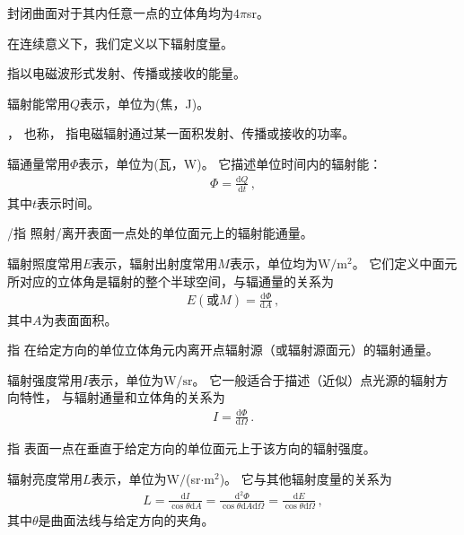 \begin{corollary}
      封闭曲面对于其内任意一点的立体角均为$4\pi$sr。
\end{corollary}

在连续意义下，我们定义以下辐射度量。

\begin{definition}
      指以电磁波形式发射、传播或接收的能量。
\end{definition}
辐射能常用$Q$表示，单位为(焦，J)。

\begin{definition}
      ，
      也称，
      指电磁辐射通过某一面积发射、传播或接收的功率。
\end{definition}
辐通量常用$\varPhi$表示，单位为(瓦，W)。
它描述单位时间内的辐射能：
\begin{align}
      \varPhi=\frac{\mathrm{d}Q}{\mathrm{d}t}\, ,
\end{align}
其中$t$表示时间。

\begin{definition}
      /指
      照射/离开表面一点处的单位面元上的辐射能通量。
\end{definition}
辐射照度常用$E$表示，辐射出射度常用$M$表示，单位均为$\text{W}/\text{m}^2$。
它们定义中面元所对应的立体角是辐射的整个半球空间，与辐通量的关系为
\begin{align}
      E(\text{或}M)=\frac{\mathrm{d}\varPhi}{\mathrm{d}A}\, ,
\end{align}
其中$A$为表面面积。

\begin{definition}
      指
      在给定方向的单位立体角元内离开点辐射源（或辐射源面元）的辐射通量。
\end{definition}
辐射强度常用$I$表示，单位为$\text{W}/\text{sr}$。
它一般适合于描述（近似）点光源的辐射方向特性，
与辐射通量和立体角的关系为
\begin{align}
      I=\frac{\mathrm{d}\varPhi}{\mathrm{d}\varOmega}\, .
\end{align}

\begin{definition}
      指
      表面一点在垂直于给定方向的单位面元上于该方向的辐射强度。
\end{definition}
辐射亮度常用$L$表示，单位为W$/$(sr$\cdot$m$^2$)。
它与其他辐射度量的关系为
\begin{align}\label{eq:5.ex-radiance}
      L=\frac{\mathrm{d}I}{\cos\theta\mathrm{d}A}=\frac{\mathrm{d}^2\varPhi}{\cos\theta\mathrm{d}A\mathrm{d}\varOmega}=\frac{\mathrm{d}E}{\cos\theta\mathrm{d}\varOmega}\, ,
\end{align}
其中$\theta$是曲面法线与给定方向的夹角。

